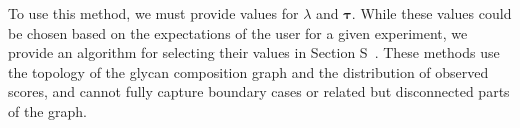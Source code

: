         To use this method, we must provide values for $\lambda$ and $\mathbf{\tau}$.
        While these values could be chosen based on the expectations of the user for
        a given experiment, we provide an algorithm for selecting their values in Section
        S~.
        These methods use the topology of the glycan composition graph and the
        distribution of observed scores, and cannot fully capture boundary cases
        or related but disconnected parts of the graph.
